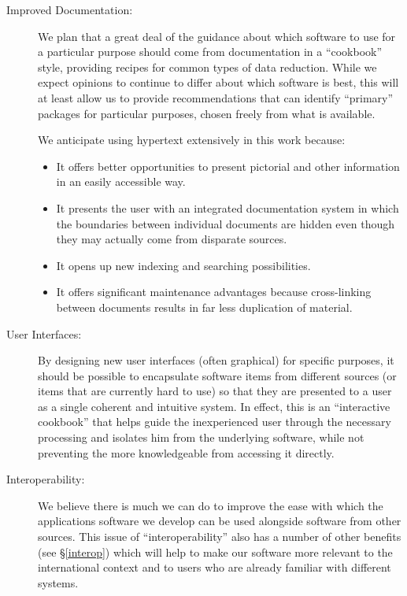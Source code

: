 \documentclass[twoside,11pt]{article}
\newcommand{\htmlref}[2]{#1}
\newcommand{\latex}[1]{#1}
\newcommand{\qt}[1]{``#1''}
\newcommand{\qt}[1]{{\tt{"}}#1{\tt{"}}}
\begin{document}
\begin{description}
\item[Improved Documentation:] We plan that a great deal of the guidance
about which software to use for a particular purpose should come from
documentation in a \qt{cookbook} style, providing recipes for common
types of data reduction. While we expect opinions to continue to
differ about which software is best, this will at least allow us to
provide recommendations that can identify \qt{primary} packages for
particular purposes, chosen freely from what is available.

We anticipate using hypertext extensively in this work because:
\begin{itemize}
\item It offers better opportunities to present pictorial and other
information in an easily accessible way.
\item It presents the user with an integrated documentation system in
which the boundaries between individual documents are hidden even
though they may actually come from disparate sources.
\item It opens up new indexing and searching possibilities.
\item It offers significant maintenance advantages because
cross-linking between documents results in far less duplication of
material.
\end{itemize}

\item[User Interfaces:] By designing new user interfaces
(often graphical) for specific purposes, it should be possible to
encapsulate software items from different sources (or items that are
currently hard to use) so that they are presented to a user as a
single coherent and intuitive system. In effect, this is an
\qt{interactive cookbook} that helps guide the inexperienced user
through the necessary processing and isolates him from the underlying
software, while not preventing the more knowledgeable from accessing
it directly.

\item[Interoperability:] We believe there is much we can do to improve
the ease with which the applications software we develop can be used
alongside software from other sources. This issue of
\qt{\htmlref{interoperability}{interop}} also has a number of other
benefits\latex{ (see \S\ref{interop})} which will help to make our
software more relevant to the international context and to users who
are already familiar with different systems.

\end{description}
\end{document}
